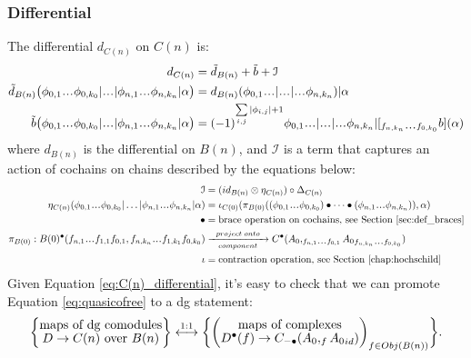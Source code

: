 \subsubsection{Differential}
The differential $d_{C(n)}$ on $C(n)$ is: 
%
\begin{equation} 
\label{eq:C(n)_differential}
\begin{split}
d_{C(n)} &= 
\tilde{d}_{B(n)} + \tilde{b} + \mathcal{I}\\
%
\tilde{d}_{B(n)} \big(
\phi_{0,1}\smdots\phi_{0,k_0} | \smdots |
\phi_{n,1}\smdots\phi_{n,k_n} | \alpha \big) 
&=
d_{B(n)}( \phi_{0,1}\smdots | 
\smdots | \smdots\phi_{n,k_n} ) | \alpha\\
%
\tilde{b} \big(
\phi_{0,1}\smdots\phi_{0,k_0} | \smdots |
\phi_{n,1}\smdots\phi_{n,k_n} | \alpha \big) 
&=
(-1)^{\sum \limits_{i,j}|\phi_{i,j}|+1}
\phi_{0,1}\smdots | \smdots | \smdots 
\phi_{n,k_n} | [_{f_{n,k_n}\smdots f_{0,k_0}}
b](\alpha)
\end{split}
\end{equation}
%
where $d_{B(n)}$ is the differential on $B(n)$, 
and $\mathcal{I}$ is a term that captures an action of cochains on chains described by the equations below:
%
\begin{equation}\label{eq:action_term}
\begin{split}
\mathcal{I} 
&= 
(id_{B(n)} \otimes \eta_{C(n)})
  \circ \Delta_{C(n)}\\
\eta_{C(n)}(
\phi_{0,1}\smdots\phi_{0,k_0} | \dots |
\phi_{n,1}\smdots\phi_{n,k_n} | \alpha)
&= 
\iota_{C(0)}( \pi_{B(0)}( 
(\phi_{0,1}\smdots \phi_{0,k_0}) \bullet \dots \bullet
(\phi_{n,1}\smdots \phi_{n,k_n})), \alpha)\\
\bullet
&= 
\textrm{brace operation on cochains, 
  see Section \ref{sec:def_braces}}\\
\pi_{B(0)}: 
B(0)^\bullet
(f_{n,1}\smdots f_{1,1} f_{0,1}, 
f_{n,k_n}\smdots f_{1,k_1} f_{0,k_0})
&\xrightarrow[component]{project\;onto}
C^\bullet(A_0, _{f_{n,1}\smdots f_{0,1}}{A_0}_{f_{n,k_n}\smdots f_{0,k_0}})\\
\iota
&=
\textrm{contraction operation, 
see Section \ref{chap:hochschild}}
\end{split}
\end{equation}
%
Given Equation \ref{eq:C(n)_differential}, 
it's easy to check that we can promote 
Equation \ref{eq:quasicofree} to a dg statement:
%
\begin{equation*}
\bigg\{ \let\scriptstyle\textstyle
\substack{\textrm{maps of dg comodules}\\
  D \to C(n)\textrm{ over }B(n)} 
\bigg\}
\overset{1:1}{\longleftrightarrow}
\bigg\{ \bigg( \let\scriptstyle\textstyle
\substack{\textrm{maps of complexes}\\
  D^\bullet(f) \to C_{-\bullet}(A_0, _f{A_0}_{id})}
\bigg)_{f \in Obj(B(n))} \bigg\}.
\end{equation*}